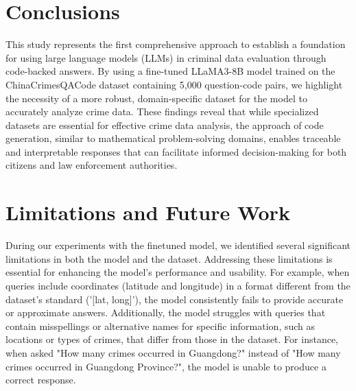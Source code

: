 
\section{Conclusions}



This study represents the first comprehensive approach to establish a foundation for using large language models (LLMs) in criminal data evaluation through code-backed answers. By using a fine-tuned LLaMA3-8B model trained on the ChinaCrimesQACode dataset containing 5,000 question-code pairs, we highlight the necessity of a more robust, domain-specific dataset for the model to accurately analyze crime data. These findings reveal that while specialized datasets are essential for effective crime data analysis, the approach of code generation, similar to mathematical problem-solving domains, enables traceable and interpretable responses that can facilitate informed decision-making for both citizens and law enforcement authorities.



\section{Limitations and Future Work}

During our experiments with the finetuned model, we identified several significant limitations in both the model and the dataset. Addressing these limitations is essential for enhancing the model's performance and usability. For example, when queries include coordinates (latitude and longitude) in a format different from the dataset's standard ('[lat, long]'), the model consistently fails to provide accurate or approximate answers. Additionally, the model struggles with queries that contain misspellings or alternative names for specific information, such as locations or types of crimes, that differ from those in the dataset. For instance, when asked "How many crimes occurred in Guangdong?" instead of "How many crimes occurred in Guangdong Province?", the model is unable to produce a correct response.

